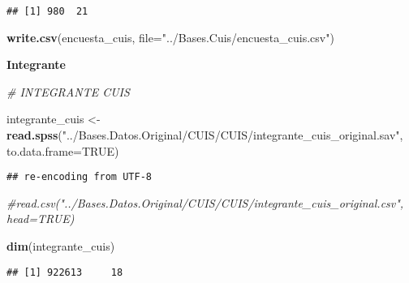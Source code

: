 \documentclass[11pt,]{article}
\newenvironment{Shaded}{\begin{snugshade}}{\end{snugshade}}
\newcommand{\KeywordTok}[1]{\textcolor[rgb]{0.13,0.29,0.53}{\textbf{#1}}}
\newcommand{\DataTypeTok}[1]{\textcolor[rgb]{0.13,0.29,0.53}{#1}}
\newcommand{\DecValTok}[1]{\textcolor[rgb]{0.00,0.00,0.81}{#1}}
\newcommand{\StringTok}[1]{\textcolor[rgb]{0.31,0.60,0.02}{#1}}
\newcommand{\CommentTok}[1]{\textcolor[rgb]{0.56,0.35,0.01}{\textit{#1}}}
\newcommand{\OtherTok}[1]{\textcolor[rgb]{0.56,0.35,0.01}{#1}}
\newcommand{\OperatorTok}[1]{\textcolor[rgb]{0.81,0.36,0.00}{\textbf{#1}}}
\newcommand{\NormalTok}[1]{#1}
\begin{document}
\begin{verbatim}
## [1] 980  21
\end{verbatim}

\begin{Shaded}
\begin{Highlighting}[]
\KeywordTok{write.csv}\NormalTok{(encuesta_cuis, }\DataTypeTok{file=}\StringTok{"../Bases.Cuis/encuesta_cuis.csv"}\NormalTok{)}
\end{Highlighting}
\end{Shaded}

\textbf{Integrante}

\begin{Shaded}
\begin{Highlighting}[]
\CommentTok{# INTEGRANTE CUIS}

\NormalTok{integrante_cuis <-}\StringTok{ }\KeywordTok{read.spss}\NormalTok{(}\StringTok{"../Bases.Datos.Original/CUIS/CUIS/integrante_cuis_original.sav"}\NormalTok{, }\DataTypeTok{to.data.frame=}\OtherTok{TRUE}\NormalTok{)}
\end{Highlighting}
\end{Shaded}

\begin{verbatim}
## re-encoding from UTF-8
\end{verbatim}

\begin{Shaded}
\begin{Highlighting}[]
                  \CommentTok{#read.csv("../Bases.Datos.Original/CUIS/CUIS/integrante_cuis_original.csv", head=TRUE)}

\KeywordTok{dim}\NormalTok{(integrante_cuis)}
\end{Highlighting}
\end{Shaded}

\begin{verbatim}
## [1] 922613     18
\end{verbatim}

\begin{Shaded}
\end{Shaded}
\end{document}
